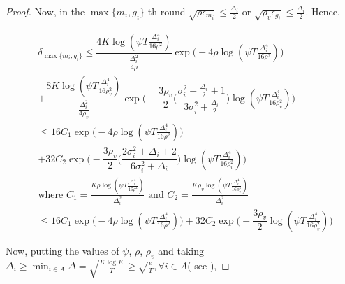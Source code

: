 \begin{proof}
Now, in the $\max\lbrace m_{i}, g_{i}\rbrace$-th round $\sqrt{\rho\epsilon_{m_{i}}}\leq \frac{\Delta_{i}}{2}$ or $\sqrt{\rho_v\epsilon_{g_{i}}}\leq \frac{\Delta_{i}}{2}$. Hence,

\begin{small}
\begin{align*}
&\delta_{\max\lbrace m_{i},g_{i}\rbrace} \leq \dfrac{4K\log (\psi T \frac{\Delta_{i}^{4}}{16\rho^{2}})}{\frac{\Delta_{i}^{2}}{4\rho}}\exp\bigg(-4\rho\log (\psi T\frac{\Delta_{i}^{4}}{16\rho^{2}})\bigg)\\
& + \dfrac{8K\log (\psi T \frac{\Delta_{i}^{4}}{16\rho_{v}^{2}})}{\frac{\Delta_{i}^{2}}{4\rho_{v}}}\exp\bigg(- \dfrac{3\rho_v}{2} \bigg(\dfrac{\sigma_{i}^{2}+\frac{\Delta_{i}}{2}+1}{3\sigma_{i}^{2}+\frac{\Delta_{i}}{2}}\bigg) \log(\psi T\frac{\Delta_{i}^{4}}{16\rho_{v}^{2}}) \bigg)\\
&\leq 16 C_1\exp\bigg(-4\rho\log (\psi T\frac{\Delta_{i}^{4}}{16\rho^{2}})\bigg)\\
& + 32C_2\exp\bigg(- \dfrac{3\rho_v}{2} \bigg(\dfrac{2\sigma_{i}^{2}+\Delta_{i}+2}{6\sigma_{i}^{2}+\Delta_{i}}\bigg) \log(\psi T\frac{\Delta_{i}^{4}}{16\rho_{v}^{2}}) \bigg)\\
&\text{where $C_1=\frac{K\rho\log (\psi T \frac{\Delta_{i}^{4}}{16\rho^{2}})}{\Delta_{i}^{2}}$ and $C_2= \frac{K\rho_v\log (\psi T \frac{\Delta_{i}^{4}}{16\rho_{v}^{2}})}{\Delta_{i}^{2}}$}\\
&\leq 16 C_1\exp\bigg(-4\rho\log (\psi T\frac{\Delta_{i}^{4}}{16\rho^{2}})\bigg)
 + 32C_2\exp\bigg(- \dfrac{3\rho_v}{2} \log(\psi T\frac{\Delta_{i}^{4}}{16\rho_{v}^{2}}) \bigg)
\end{align*}
\end{small}

Now, putting the values of $\psi$, $\rho$, $\rho_v$ and taking $\Delta_{i}\geq\min_{i\in A}\Delta=\sqrt{\frac{K\log K}{T}}\geq \sqrt{\frac{e}{T}},\forall i\in A$( see \cite{auer2010ucb}), 


\end{proof}
